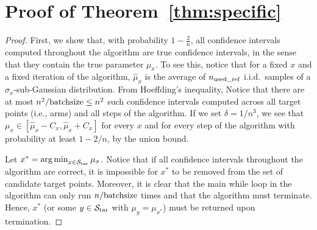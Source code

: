 \clearpage
\section{Proof of Theorem~\ref{thm:specific}}
\label{app:thmproof}




\begin{proof}
First, we show that, with probability $1-\tfrac{2}{n}$, all confidence intervals computed throughout the algorithm are true confidence intervals, in the sense that they contain the true parameter $\mu_x$.
To see this, notice that for a fixed $x$ and a fixed iteration of the algorithm, $\hat \mu_x$ is the average of $n_{\text{used\_ref}}$ i.i.d.~samples of a $\sigma_x$-sub-Gaussian distribution.
From Hoeffding's inequality, 
Notice that there are at most $n^2/{\rm batchsize} \leq n^2$ such confidence intervals computed across all target points (i.e., arms) and all steps of the algorithm.
If we set $\delta = 1/n^3$, we see that $\mu_x \in [\hat \mu_x - C_x, \hat \mu_x + C_x]$ for every $x$ and for every step of the algorithm with probability at least $1-2/n$, by the union bound.

Let $x^* = \operatorname*{arg\,min}_{x \in \mathcal{S}_{\text{tar}}} \mu_x$.
Notice that if all confidence intervals throughout the algorithm are correct, it is impossible for $x^*$ to be removed from the set of candidate target points. 
Moreover, it is clear that the main while loop in the algorithm can only run $n/{\rm batchsize}$ times and that the algorithm must terminate.
Hence, $x^*$ (or some $y \in \mathcal{S}_{\text{tar}}$ with $\mu_y = \mu_{x^*}$) must be returned upon termination.



\end{proof}
